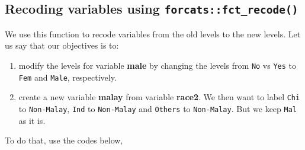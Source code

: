 \documentclass[
]{book}
\makeatletter
\newenvironment{Shaded}{\begin{snugshade}}{\end{snugshade}}
\newcommand{\AttributeTok}[1]{\textcolor[rgb]{0.61,0.61,0.61}{#1}}
\newcommand{\FunctionTok}[1]{\textcolor[rgb]{0,0,0}{#1}}
\newcommand{\NormalTok}[1]{#1}
\newcommand{\OtherTok}[1]{\textcolor[rgb]{0.37,0.37,0.37}{#1}}
\newcommand{\SpecialCharTok}[1]{\textcolor[rgb]{0,0,0}{#1}}
\newcommand{\StringTok}[1]{\textcolor[rgb]{0.5,0.5,0.5}{#1}}
\providecommand{\tightlist}{%
  \setlength{\itemsep}{0pt}\setlength{\parskip}{0pt}}
\newenvironment{kframe}{%
\medskip{}
\setlength{\fboxsep}{.8em}
 \def\at@end@of@kframe{}%
 \ifinner\ifhmode%
  \def\at@end@of@kframe{\end{minipage}}%
  \begin{minipage}{\columnwidth}%
 \fi\fi%
 \def\FrameCommand##1{\hskip\@totalleftmargin \hskip-\fboxsep
 \colorbox{shadecolor}{##1}\hskip-\fboxsep
     \hskip-\linewidth \hskip-\@totalleftmargin \hskip\columnwidth}%
 \MakeFramed {\advance\hsize-\width
   \@totalleftmargin\z@ \linewidth\hsize
   \@setminipage}}%
 {\par\unskip\endMakeFramed%
 \at@end@of@kframe}
\renewenvironment{Shaded}{\begin{kframe}}{\end{kframe}}
\makeatother
\begin{document}
\hypertarget{recoding-variables-using-forcatsfct_recode}{%
\subsection{\texorpdfstring{Recoding variables using \texttt{forcats::fct\_recode()}}{Recoding variables using forcats::fct\_recode()}}\label{recoding-variables-using-forcatsfct_recode}}

We use this function to recode variables from the old levels to the new levels. Let us say that our objectives is to:

\begin{enumerate}
\def\labelenumi{\arabic{enumi}.}
\tightlist
\item
  modify the levels for variable \textbf{male} by changing the levels from \texttt{No} vs \texttt{Yes} to \texttt{Fem} and \texttt{Male}, respectively.
\item
  create a new variable \textbf{malay} from variable \textbf{race2}. We then want to label \texttt{Chi} to \texttt{Non-Malay}, \texttt{Ind} to \texttt{Non-Malay} and \texttt{Others} to \texttt{Non-Malay}. But we keep \texttt{Mal} as it is.
\end{enumerate}

To do that, use the codes below,

\begin{Shaded}
\end{Shaded}
\end{document}
